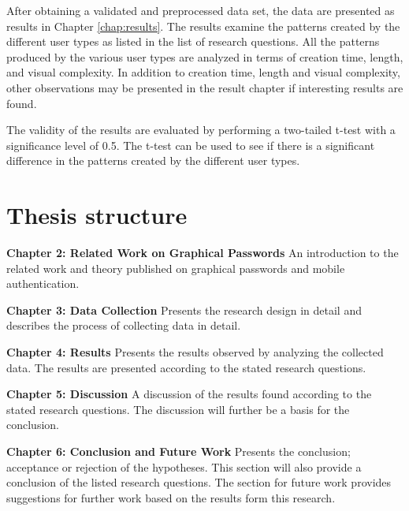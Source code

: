       After obtaining a validated and preprocessed data set, the data are presented as results in Chapter \ref{chap:results}. The results examine the patterns created by the different user types as listed in the list of research questions. All the patterns produced by the various user types are analyzed in terms of creation time, length, and visual complexity. In addition to creation time, length and visual complexity, other observations may be presented in the result chapter if interesting results are found. 

      The validity of the results are evaluated by performing a two-tailed t-test with a significance level of 0.5. The t-test can be used to see if there is a significant difference in the patterns created by the different user types.

  \clearpage
  \section{Thesis structure} \label{sec:structure}

    {\bf Chapter 2: Related Work on Graphical Passwords}
    An introduction to the related work and theory published on graphical passwords and mobile authentication.

    {\bf Chapter 3: Data Collection}
    Presents the research design in detail and describes the process of collecting data in detail.

    {\bf Chapter 4: Results}
    Presents the results observed by analyzing the collected data. The results are presented according to the stated research questions.

    {\bf Chapter 5: Discussion}
    A discussion of the results found according to the stated research questions. The discussion will further be a basis for the conclusion. 

    {\bf Chapter 6: Conclusion and Future Work}
    Presents the conclusion; acceptance or rejection of the hypotheses. This section will also provide a conclusion of the listed research questions. The section for future work provides suggestions for further work based on the results form this research. 